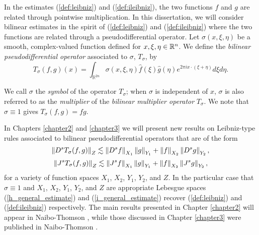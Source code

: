 In the estimates (\ref{def:leibniz}) and (\ref{def:ileibniz}), the two functions $f$ and $g$ are related through pointwise multiplication. In this dissertation, we will consider bilinear estimates in the spirit of (\ref{def:leibniz}) and (\ref{def:ileibniz}) where the two functions are related through a pseudodifferential operator. Let $\sigma(x,\xi,\eta)$ be a smooth, complex-valued function defined for $x,\xi,\eta\in{{\mathbb R}^n}$. We define the \textit{bilinear pseudodifferential operator}  associated to $\sigma$, $T_\sigma$, by 
\begin{equation}\label{psydo}
T_{\sigma}(f,g)(x) = \int_{\mathbb{R}^{2n}} \sigma(x,\xi,\eta) \widehat{f}(\xi)\widehat{g}(\eta)e^{2\pi i x\cdot(\xi+\eta)}d\xi d\eta. 
\end{equation}

\noindent We call $\sigma$ the \textit{symbol} of the operator $T_\sigma$; when $\sigma$ is independent of $x$, $\sigma$ is also referred to as the \textit{multiplier} of the \textit{bilinear multiplier operator} $T_\sigma$. We note that $\sigma \equiv 1$ gives $T_\sigma(f,g) = fg$. 


In Chapters \ref{chapter2} and \ref{chapter3} we will present new results on Leibniz-type rules associated to bilinear pseudodifferential operators that are of the form 
\begin{equation}\label{h_general_estimate}
\left\|D^s T_\sigma(f,g)\right\|_{Z} \lesssim \left\|D^sf\right\|_{X_1}\left\|g\right\|_{Y_1} + \left\|f\right\|_{X_2}\left\|D^s g\right\|_{Y_2} ,
\end{equation}
\begin{equation}\label{i_general_estimate}
\left\|J^sT_\sigma(f,g)\right\|_{Z} \lesssim \left\|J^sf\right\|_{X_1}\left\|g\right\|_{Y_1} + \left\|f\right\|_{X_2}\left\|J^sg\right\|_{Y_2} ,
\end{equation}
for a variety of function spaces $X_1$, $X_2$, $Y_1$, $Y_2$, and $Z$. In the particular case that $\sigma \equiv 1$ and $X_1$, $X_2$, $Y_1$, $Y_2$, and $Z$ are appropriate Lebesgue spaces (\ref{h_general_estimate}) and (\ref{i_general_estimate}) recover (\ref{def:leibniz}) and (\ref{def:ileibniz}) respectively. The main results presented in Chapter \ref{chapter2} will appear in Naibo-Thomson \cite{NaTh_CM}, while those discussed in Chapter \ref{chapter3} were published in Naibo-Thomson \cite{MR3912862}.

